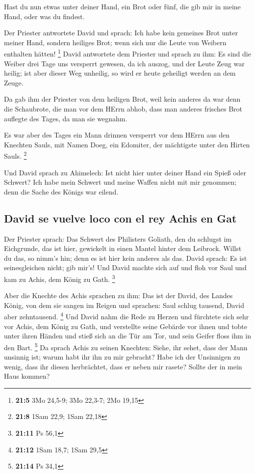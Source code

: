  Hast du nun etwas unter deiner Hand, ein Brot oder fünf,
die gib mir in meine Hand, oder was du findest.

 Der Priester antwortete David und sprach: Ich habe kein
gemeines Brot unter meiner Hand, sondern heiliges Brot; wenn sich nur
die Leute von Weibern enthalten hätten! \footnote{\textbf{21:5} 3Mo
  24,5-9; 3Mo 22,3-7; 2Mo 19,15}  David antwortete dem
Priester und sprach zu ihm: Es sind die Weiber drei Tage uns versperrt
gewesen, da ich auszog, und der Leute Zeug war heilig; ist aber dieser
Weg unheilig, so wird er heute geheiligt werden an dem Zeuge.

 Da gab ihm der Priester von dem heiligen Brot, weil kein
anderes da war denn die Schaubrote, die man vor dem HErrn abhob, dass
man anderes frisches Brot auflegte des Tages, da man sie wegnahm.

 Es war aber des Tages ein Mann drinnen versperrt vor dem
HErrn aus den Knechten Sauls, mit Namen Doeg, ein Edomiter, der
mächtigste unter den Hirten Sauls. \footnote{\textbf{21:8} 1Sam 22,9;
  1Sam 22,18}

 Und David sprach zu Ahimelech: Ist nicht hier unter
deiner Hand ein Spieß oder Schwert? Ich habe mein Schwert und meine
Waffen nicht mit mir genommen; denn die Sache des Königs war eilend.

\hypertarget{david-se-vuelve-loco-con-el-rey-achis-en-gat}{%
\subsection{David se vuelve loco con el rey Achis en
Gat}\label{david-se-vuelve-loco-con-el-rey-achis-en-gat}}

 Der Priester sprach: Das Schwert des Philisters Goliath,
den du schlugst im Eichgrunde, das ist hier, gewickelt in einen Mantel
hinter dem Leibrock. Willst du das, so nimm's hin; denn es ist hier kein
anderes als das. David sprach: Es ist seinesgleichen nicht; gib mir's!
 Und David machte sich auf und floh vor Saul und kam zu
Achis, dem König zu Gath. \footnote{\textbf{21:11} Ps 56,1}

 Aber die Knechte des Achis sprachen zu ihm: Das ist der
David, des Landes König, von dem sie sangen im Reigen und sprachen: Saul
schlug tausend, David aber zehntausend. \footnote{\textbf{21:12} 1Sam
  18,7; 1Sam 29,5}  Und David nahm die Rede zu Herzen und
fürchtete sich sehr vor Achis, dem König zu Gath,  und
verstellte seine Gebärde vor ihnen und tobte unter ihren Händen und
stieß sich an die Tür am Tor, und sein Geifer floss ihm in den Bart.
\footnote{\textbf{21:14} Ps 34,1}  Da sprach Achis zu
seinen Knechten: Siehe, ihr sehet, dass der Mann unsinnig ist; warum
habt ihr ihn zu mir gebracht?  Habe ich der Unsinnigen zu
wenig, dass ihr diesen herbrächtet, dass er neben mir rasete? Sollte der
in mein Haus kommen?

